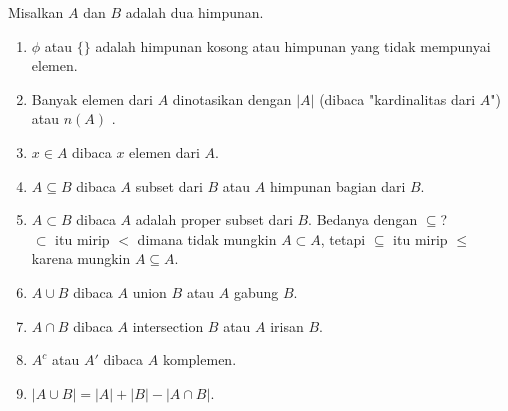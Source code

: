	Misalkan $A$ dan $B$ adalah dua himpunan.
	\begin{enumerate}
	    \item $\phi$ atau $\{\}$ adalah himpunan kosong atau himpunan yang tidak mempunyai elemen.
	    \item Banyak elemen dari $A$ dinotasikan dengan $|A|$ (dibaca "kardinalitas dari $A$") atau $n(A)$ .
	    \item $x \in A$ dibaca $x$ elemen dari $A$.
	    \item $A \subseteq B$ dibaca $A$ subset dari $B$ atau $A$ himpunan bagian dari $B$.
	    \item $A \subset B$ dibaca $A$ adalah proper subset dari $B$. Bedanya dengan $\subseteq$?\\
	    $\subset$ itu mirip $<$ dimana tidak mungkin $A \subset A$, tetapi $\subseteq$ itu mirip $\le$ karena mungkin $A \subseteq A$.
	    \item $A \cup B$ dibaca $A$ union $B$ atau $A$ gabung $B$.
	    \item $A \cap B$ dibaca $A$ intersection $B$ atau $A$ irisan $B$.
	    \item $A^c$ atau $A'$ dibaca $A$ komplemen.
	    \item $|A \cup B| = |A|+|B|-|A \cap B|$.
	\end{enumerate}
	
